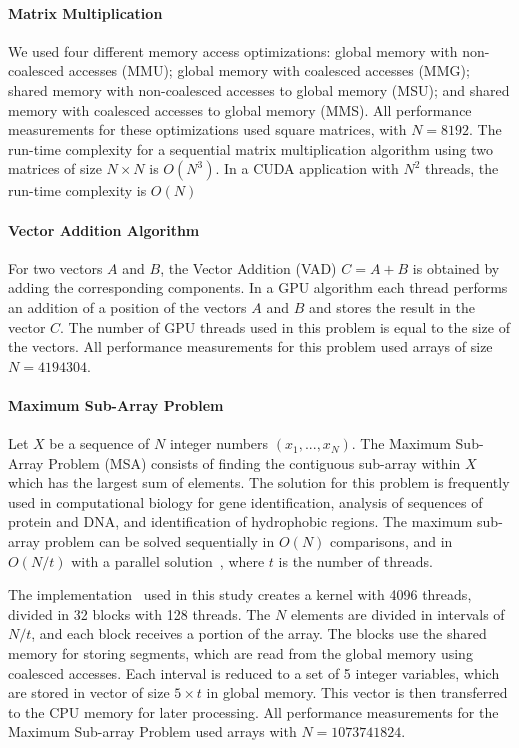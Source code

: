 \paragraph{Matrix Multiplication} We used four different memory access
optimizations: global memory with non-coalesced accesses (MMU); global memory
with coalesced accesses (MMG); shared memory with non-coalesced accesses to
global memory (MSU); and shared memory with coalesced accesses to global memory
(MMS).  All performance measurements for these optimizations used square
matrices, with $N = 8192$.  The run-time complexity for a sequential matrix
multiplication algorithm using two matrices of size $N\times{}N$ is $O(N^3)$.
In a CUDA application with $N^2$ threads, the run-time complexity is $O(N)$

\paragraph{Vector Addition Algorithm} For two vectors $A$ and $B$, the Vector
Addition (VAD) $C = A + B$ is obtained by adding the corresponding components.
In a GPU algorithm each thread performs an addition of a position of the
vectors $A$ and $B$ and stores the result in the vector $C$.  The number of GPU
threads used in this problem is equal to the size of the vectors.  All
performance measurements for this problem used arrays of size $N = 4194304$.

\paragraph{Maximum Sub-Array Problem} Let $X$ be a sequence of $N$ integer
numbers $(x_1, ... , x_N)$.  The Maximum Sub-Array Problem (MSA) consists of
finding the contiguous sub-array within $X$ which has the largest sum of
elements. The solution for this problem is frequently used in computational
biology for gene identification, analysis of sequences of protein and DNA, and
identification of hydrophobic regions.  The maximum sub-array problem can be
solved sequentially in $O(N)$ comparisons, and in $O(N/t)$
with a parallel solution~\cite{alves2004bsp}, where $t$ is the number of
threads.

The implementation~\cite{ferreira2014parallel} used in this study creates a
kernel with 4096 threads, divided in 32 blocks with 128 threads.  The $N$
elements are divided in intervals of $N/t$, and each block receives a portion
of the array.  The blocks use the shared memory for storing segments, which are
read from the global memory using coalesced accesses. Each interval is reduced
to a set of 5 integer variables, which are stored in vector of size $5 \times
t$ in global memory. This vector is then transferred to the CPU memory for
later processing.  All performance measurements for the Maximum Sub-array
Problem used arrays with $N = 1073741824$.

